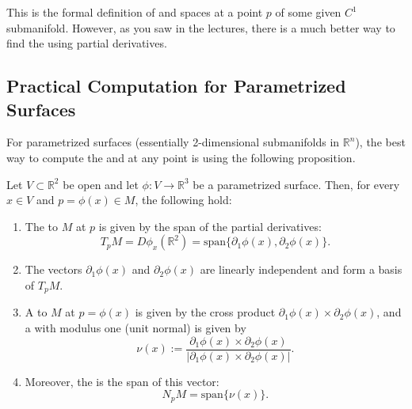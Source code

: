 This is the formal definition of  and  spaces at a point $p$ of some given $C^1$ submanifold. %
However, as you saw in the lectures, there is a much better way to find the  using partial derivatives. %

\subsection{Practical Computation for Parametrized Surfaces}

For parametrized surfaces (essentially 2-dimensional submanifolds in $\mathbb{R}^n$), the best way to compute the  and  at any point is using the following proposition. %

\setcounter{savedSection}{\value{section}}
\setcounter{section}{12}
\setcounter{theorem}{15}

\begin{proposition} %
Let $V \subset \mathbb{R}^2$ be open and let $\phi : V \to \mathbb{R}^3$ be a parametrized surface. %
Then, for every $x \in V$ and $p = \phi(x) \in M$, the following hold: %
\begin{enumerate}
    \item The  to $M$ at $p$ is given by the span of the partial derivatives:
    \[
    T_pM = D\phi_x(\mathbb{R}^2) = \text{span}\{\partial_1\phi(x), \partial_2\phi(x)\}. %
    \]
    \item The vectors $\partial_1\phi(x)$ and $\partial_2\phi(x)$ are linearly independent and form a basis of $T_pM$. %
    \item A  to $M$ at $p = \phi(x)$ is given by the cross product $\partial_1\phi(x) \times \partial_2\phi(x)$, and a  with modulus one (unit normal) is given by %
    \[
    \nu(x) := \frac{\partial_1\phi(x) \times \partial_2\phi(x)}{|\partial_1\phi(x) \times \partial_2\phi(x)|}. %
    \]
    \item Moreover, the  is the span of this vector:
    \[
    N_pM = \text{span}\{\nu(x)\}. %
    \]
\end{enumerate}
\end{proposition}

\setcounter{section}{\value{savedSection}}

